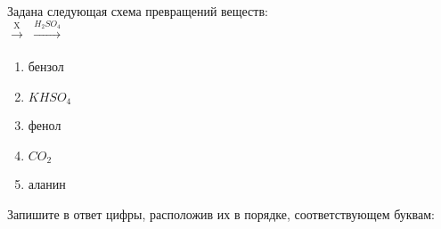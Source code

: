 Задана следующая схема превращений веществ: \\
 $\xrightarrow[]{\text{X}}$  $\xrightarrow[]{H_2SO_4}$  \\
\begin{enumerate}
    \item бензол
    \item $KHSO_{4}$
    \item фенол
    \item $CO_{2}$
    \item аланин
\end{enumerate}
Запишите в ответ цифры, расположив их в порядке, соответствующем буквам:
\\
